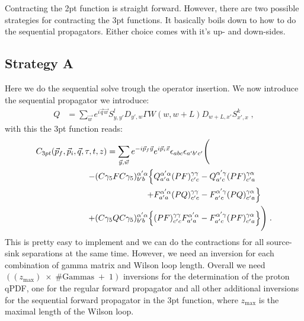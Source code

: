 \documentclass[a4paper,10pt]{scrartcl}
\begin{document}
Contracting the 2pt function is straight forward. However, there are two possible strategies for contracting the 3pt functions. It basically boils down
to how to do the sequential propagators. Either choice comes with it's up- and down-sides.
\subsection{Strategy A}
Here we do the sequential solve trough the operator insertion. We now introduce the sequential propagator
we introduce:
\begin{align}
    Q &= \sum_{\vec w} e^{i \vec q \vec w} S^l_{y,y'} D_{y',w} \Gamma W(w, w+L) D_{w+L,x'} S^k_{x',x} \; ,   
\end{align}
with this the 3pt function reads:
\begin{align}
    C_{3pt}(\vec p_f, \vec p_i, \vec q, \tau, t, z) = \sum_{\vec y, \vec w} e^{-i \vec p_f \vec y} &e^{i \vec p_i \vec x} \epsilon_{abc} \epsilon_{a'b'c'} \Biggl(\notag \\
    -(C\gamma_5 F C\gamma_5)^{\alpha' \alpha}_{b'b} \Big \lbrace &Q^{\alpha' \alpha}_{a'a} (PF)^{\gamma \gamma}_{c'c} - Q^{\alpha' \gamma}_{a'c} (P F)^{\gamma \alpha}_{c'a} \notag\\
    + &F^{\alpha' \alpha}_{a'a} (PQ)^{\gamma \gamma}_{c'c} - F^{\alpha' \gamma}_{a'c} (P Q)^{\gamma \alpha}_{c'a} \Big \rbrace  \\
    + (C\gamma_5 Q C\gamma_5)^{\alpha' \alpha}_{b'b} \Big \lbrace & (PF)^{\gamma \gamma}_{c'c} F^{\alpha' \alpha}_{a'a} - F^{\alpha' \gamma}_{a'c} (PF)^{\gamma \alpha}_{c'a} \Big \rbrace \Biggr) \notag \; .
\end{align}
This is pretty easy to implement and we can do the contractions for all source-sink separations at the same time. However, we need an inversion for each
combination of gamma matrix and Wilson loop length. Overall we need $((z_\text{max}) \; \times \; \#\text{Gammas} \; + \;1)$ inversions for the determination of the proton qPDF, 
one for the regular forward propagator and all other additional inversions for the sequential forward propagator
in the 3pt function, where $z_\text{max}$ is the maximal length of the Wilson loop. \newline
\end{document}
